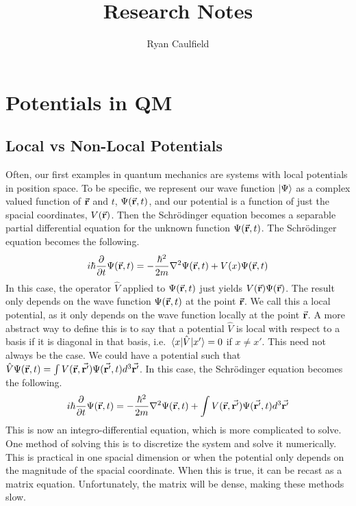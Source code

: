 \documentclass[12pt,letterpaper]{article}
\title{Research Notes}
\author{Ryan Caulfield}
\date{}
\numberwithin{equation}{section}
\newcommand{\beq}{\begin{equation}}
\newcommand{\eeq}{\end{equation}}
\begin{document}
\maketitle
\newpage

\maketitle
\tableofcontents

\newpage
\section{Potentials in QM}
\subsection{Local vs Non-Local Potentials}
Often, our first examples in quantum mechanics are systems with local potentials in position space. To be specific, we represent our wave function $\ket{\Psi}$ as a complex valued function of $\va{r}$ and $t$, $\Psi(\va{r},t)$, and our potential is a function of just the spacial coordinates, $V(\va{r})$. Then the Schrödinger equation becomes a separable partial differential equation for the unknown function $\Psi(\va{r},t)$. The Schrödinger equation becomes the following.
\beq
i\hbar\pdv{t} \Psi(\va{r},t) = -\frac{\hbar^2}{2m} \laplacian \Psi(\va{r},t) + V(x)\Psi(\va{r},t)
\eeq
In this case, the operator $\hat{V}$ applied to $\Psi(\va{r},t)$ just yields $V(\va{r})\Psi(\va{r})$. The result only depends on the wave function $\Psi(\va{r},t)$ at the point $\va{r}$. We call this a local potential, as it only depends on the wave function locally at the point $\va{r}$. 
\newline \indent
A more abstract way to define this is to say that a potential $\hat{V}$ is local with respect to a basis if it is diagonal in that basis, i.e. $\matrixel{x}{\hat{V}}{x'} = 0$ if $x\neq x'$. This need not always be the case. We could have a potential such that  $\hat{V}\Psi(\va{r},t) = \int V(\va{r},\va{r'})\Psi(\va{r'},t)d^3\va{r'}$. In this case, the Schrödinger equation becomes the following.
\beq
i\hbar\pdv{t} \Psi(\va{r},t) = -\frac{\hbar^2}{2m} \laplacian \Psi(\va{r},t) + \int V(\va{r},\va{r'})\Psi(\va{r'},t)d^3\va{r'}
\eeq
This is now an integro-differential equation, which is more complicated to solve. One method of solving this is to discretize the system and solve it numerically. This is practical in one spacial dimension or when the potential only depends on the magnitude of the spacial coordinate. When this is true, it can be recast as a matrix equation. Unfortunately, the matrix will be dense, making these methods slow.
\end{document}
